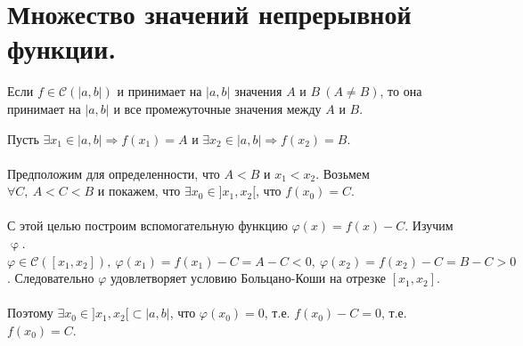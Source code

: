 \section{Множество значений непрерывной функции.}
\begin{theorem}
	Если $f \in \mathcal{C} (|a,b|)$ и принимает на $|a,b|$ значения $A$ и $B \ (A \neq B)$, то она принимает на $|a,b|$ и все промежуточные значения между $A$ и $B$.
\end{theorem}
\begin{Proof}
	Пусть $\exists x_1 \in |a,b| \Rightarrow f(x_1) = A$ и $\exists x_2 \in |a,b| \Rightarrow f(x_2) = B$.\\\\
	Предположим для определенности, что $A < B$ и $x_1 < x_2$. Возьмем $\forall C, \ A < C < B$ и покажем, что $\exists x_0 \in ]x_1,x_2[ $, что $f(x_0) = C$.\\\\
	С этой целью построим вспомогательную функцию $\varphi (x) = f(x) - C$. Изучим $\upvarphi$.
	$\varphi \in \mathcal{C} ([x_1,x_2]), \ \varphi (x_1) = f(x_1) - C = A-C < 0, \ \varphi (x_2) = f(x_2) - C = B-C > 0 $. Следовательно $\varphi$ удовлетворяет условию Больцано-Коши на отрезке $[x_1,x_2]$.\\\\ Поэтому $\exists x_0 \in ]x_1,x_2[ \subset |a,b|$, что $\varphi (x_0) = 0$, т.е. $f(x_0)-C = 0$, т.е. $f(x_0) = C$.
\end{Proof}
